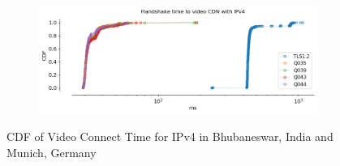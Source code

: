 \begin{frame}
\begin{figure}[!htb]
\begin{subfigure}{0.45\textwidth}
    \end{subfigure}
    \begin{subfigure}{0.45\textwidth}
        \includegraphics[width=\linewidth]{./plots/youtube/munich/graph_video_connect_time.png}
    \end{subfigure}    
    \caption{CDF of Video Connect Time for IPv4 in Bhubaneswar, India and Munich, Germany}\label{fig:cdf-of-video}
\end{figure}
\end{frame}
\clearpage

